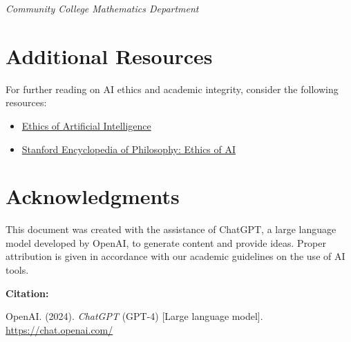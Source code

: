 \documentclass{article}
\begin{document}
\begin{flushright}
\textit{Community College Mathematics Department}
\end{flushright}



\section{Additional Resources}
For further reading on AI ethics and academic integrity, consider the following resources:
\begin{itemize}
    \item \href{https://en.wikipedia.org/wiki/Ethics_of_artificial_intelligence}{Ethics of Artificial Intelligence}
    \item \href{https://plato.stanford.edu/entries/ethics-ai/}{Stanford Encyclopedia of Philosophy: Ethics of AI}
\end{itemize}

\section*{Acknowledgments}

This document was created with the assistance of ChatGPT, a large language model developed by OpenAI, to generate content and provide ideas. Proper attribution is given in accordance with our academic guidelines on the use of AI tools.

\textbf{Citation:}

OpenAI. (2024). \textit{ChatGPT} (GPT-4) [Large language model]. \url{https://chat.openai.com/}
\end{document}
